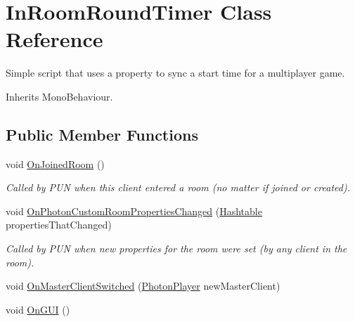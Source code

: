 \hypertarget{class_in_room_round_timer}{}\section{In\+Room\+Round\+Timer Class Reference}
\label{class_in_room_round_timer}


Simple script that uses a property to sync a start time for a multiplayer game.  




Inherits Mono\+Behaviour.

\subsection*{Public Member Functions}
\begin{DoxyCompactItemize}
\item 
void \hyperlink{class_in_room_round_timer_a17202ffb28b9e93f1d2379d79d1e9262}{On\+Joined\+Room} ()
\begin{DoxyCompactList}\small\item\em Called by P\+UN when this client entered a room (no matter if joined or created).\end{DoxyCompactList}\item 
void \hyperlink{class_in_room_round_timer_a226f64a8398f70b91ad6af4ea3b44bd8}{On\+Photon\+Custom\+Room\+Properties\+Changed} (\hyperlink{_extensions_8cs_afa613ef589c02dbd94acc273b62cdcfd}{Hashtable} properties\+That\+Changed)
\begin{DoxyCompactList}\small\item\em Called by P\+UN when new properties for the room were set (by any client in the room).\end{DoxyCompactList}\item 
void \hyperlink{class_in_room_round_timer_ae136a34f3bf637b1b5610fd202ffa1e3}{On\+Master\+Client\+Switched} (\hyperlink{class_photon_player}{Photon\+Player} new\+Master\+Client)
\item 
void \hyperlink{class_in_room_round_timer_a1c1cc2f294b32ed4dd293db35a9f4a7f}{On\+G\+UI} ()
\end{DoxyCompactItemize}

